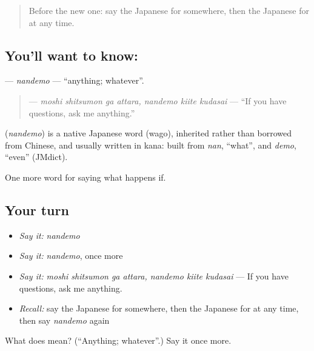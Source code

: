 \label{lesson:JA-C522-nandemo}



\begin{quote}
Before the new one: say the Japanese for somewhere, then the Japanese for at any time.
\end{quote}

\subsection*{You'll want to know: }
\textbf{} — \emph{nandemo} — \textquotedblleft{}anything; whatever\textquotedblright{}.

\begin{quote}
\textbf{    } — \emph{moshi shitsumon ga attara, nandemo kiite kudasai} — \textquotedblleft{}If you have questions, ask me anything.\textquotedblright{}
\end{quote}

\begin{cousinweb}
\textbf{} (\emph{nandemo}) is a native Japanese word (wago), inherited rather than borrowed from Chinese, and usually written in kana: built from \emph{nan}, \textquotedblleft{}what\textquotedblright{}, and \emph{demo}, \textquotedblleft{}even\textquotedblright{} (JMdict).
\end{cousinweb}

\begin{grammarlens}[title={What you've built}]
One more word for saying what happens if.
\end{grammarlens}

\subsection*{Your turn}
\begin{itemize}
\raggedright
  \item \emph{Say it:} \emph{nandemo}
  \item \emph{Say it:} \emph{nandemo}, once more
  \item \emph{Say it:} \emph{moshi shitsumon ga attara, nandemo kiite kudasai} — If you have questions, ask me anything.
  \item \emph{Recall:} say the Japanese for somewhere, then the Japanese for at any time, then say \emph{nandemo} again
\end{itemize}

\begin{tcolorbox}[breakable,colback=teal!4,colframe=teal!35!black,title={Before you move on}]
What does  mean? (\textquotedblleft{}Anything; whatever\textquotedblright{}.) Say it once more.
\end{tcolorbox}
